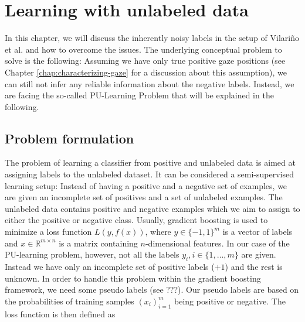 \chapter{Learning with unlabeled data}
\label{chap:learning-with-unlabeled-data}
In this chapter, we will discuss the inherently noisy labels in the setup of Vilari\~no et al. and how to overcome the issues. 
The underlying conceptual problem to solve is the following: Assuming we have only true positive gaze positions (see Chapter \ref{chap:characterizing-gaze} for a discussion about this assumption), we can still not infer any reliable information about the negative labels. Instead, we are facing the so-called PU-Learning Problem that will be explained in the following.

\section{Problem formulation}
The problem of learning a classifier from positive and unlabeled data is aimed at assigning labels to the unlabeled dataset. 
It can be considered a semi-supervised learning setup: Instead of having a positive and a negative set of examples, we are given an incomplete set of positives and a set of unlabeled examples. 
The unlabeled data contains positive and negative examples which we aim to assign to either the positive or negative class. 
Usually, gradient boosting is used to minimize a loss function $L(y,f(x))$, where $y \in \{-1,1\}^m$ is a vector of labels and $x \in \mathbb{R}^{m\times n}$ is a matrix containing $n$-dimensional features. In our case of the PU-learning problem, however, not all the labels $y_i, i \in \{1,\dots,m\}$ are given. 
Instead we have only an incomplete set of positive labels ($+1$) and the rest is unknown. In order to handle this problem within the gradient boosting framework, we need some pseudo labels (see ???). Our pseudo labels are based on the probabilities of training samples $(x_i)_{i=1}^m$ being positive or negative. The loss function is then defined as

